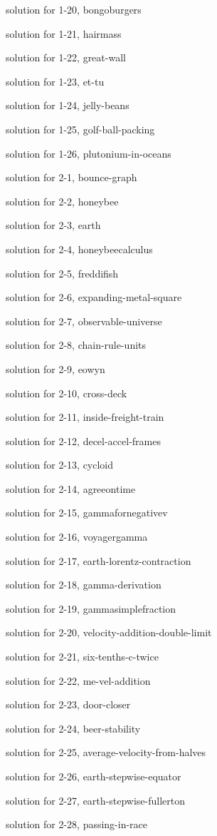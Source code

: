 \documentclass{problems}
\begin{document}
solution for 1-20, bongoburgers

solution for 1-21, hairmass

solution for 1-22, great-wall

solution for 1-23, et-tu

solution for 1-24, jelly-beans

solution for 1-25, golf-ball-packing

solution for 1-26, plutonium-in-oceans

solution for 2-1, bounce-graph

solution for 2-2, honeybee

solution for 2-3, earth

solution for 2-4, honeybeecalculus

solution for 2-5, freddifish

solution for 2-6, expanding-metal-square

solution for 2-7, observable-universe

solution for 2-8, chain-rule-units

solution for 2-9, eowyn

solution for 2-10, cross-deck

solution for 2-11, inside-freight-train

solution for 2-12, decel-accel-frames

solution for 2-13, cycloid

solution for 2-14, agreeontime

solution for 2-15, gammafornegativev

solution for 2-16, voyagergamma

solution for 2-17, earth-lorentz-contraction

solution for 2-18, gamma-derivation

solution for 2-19, gammasimplefraction

solution for 2-20, velocity-addition-double-limit

solution for 2-21, six-tenths-c-twice

solution for 2-22, me-vel-addition

solution for 2-23, door-closer

solution for 2-24, beer-stability

solution for 2-25, average-velocity-from-halves

solution for 2-26, earth-stepwise-equator

solution for 2-27, earth-stepwise-fullerton

solution for 2-28, passing-in-race
\end{document}
